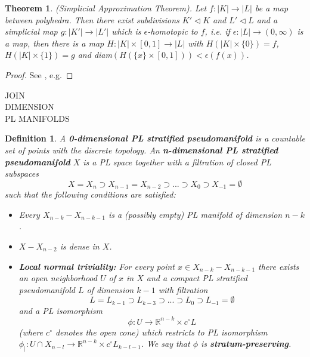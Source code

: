 \documentclass[11pt]{book}
\newtheorem{theorem}{Theorem}
\newtheorem{definition}{Definition}
\begin{document}
\begin{theorem}(Simplicial Approximation Theorem).
Let $f: |K| \to |L|$ be a map between polyhedra. Then there exist subdivisions $K' \lhd K$ and $L' \lhd L$ and a simplicial map $g: |K'| \to |L'|$ which is $\epsilon$-homotopic to $f$, i.e. if $\epsilon: |L| \to (0,\infty)$ is a map, then there is a map $H: |K| \times [0,1] \to |L|$ with $H(|K| \times \{ 0\})=f$, $H(|K| \times \{ 1\})=g$ and diam$(H(\{ x \} \times [0,1])) < \epsilon(f(x))$.
\end{theorem}

\begin{proof}
See \cite{lecturenotes}, e.g.
\end{proof}

JOIN \\
DIMENSION \\
PL MANIFOLDS

\begin{definition}
A \textbf{0-dimensional PL stratified pseudomanifold} is a countable set of points with the discrete topology. An \textbf{n-dimensional PL stratified pseudomanifold} $X$ is a PL space together with a filtration of closed PL subspaces
\begin{equation*}
X=X_n \supset X_{n-1} = X_{n-2} \supset ... \supset X_0 \supset X_{-1} = \emptyset
\end{equation*}
such that the following conditions are satisfied:
\begin{itemize}
\item Every $X_{n-k} - X_{n-k-1}$ is a (possibly empty) PL manifold of dimension $n-k$.
\item $X-X_{n-2}$ is dense in $X$.
\item \textbf{Local normal triviality:} For every point $x \in X_{n-k} - X_{n-k-1}$ there exists an open neighborhood $U$ of $x$  in $X$ and a compact PL stratified pseudomanifold $L$ of dimension $k-1$ with filtration
\begin{equation*}
L = L_{k-1} \supset L_{k-3} \supset ... \supset L_0 \supset L_{-1}= \emptyset
\end{equation*}
and a PL isomorphism
\begin{equation*}
\phi : U \to \mathbb{R}^{n-k} \times c^{\circ} L
\end{equation*}
(where $c^{\circ}$ denotes the open cone) which restricts to PL isomorphism $\phi_| : U \cap X_{n-l} \to \mathbb{R}^{n-k} \times c^{\circ} L_{k-l-1}$. We say that $\phi$ is \textbf{stratum-preserving}.
\end{itemize}
\end{definition}
\end{document}
